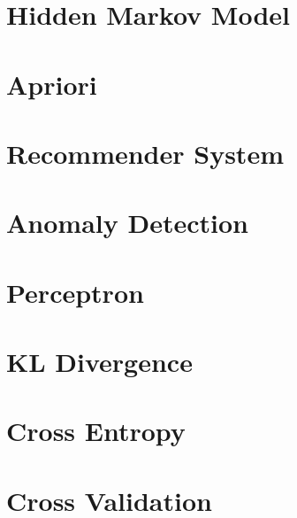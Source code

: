 \documentclass{article}
\begin{document}
\section{Hidden Markov Model}
\section{Apriori}
\section{Recommender System}
\section{Anomaly Detection} 
\section{Perceptron}
\section{KL Divergence}
\section{Cross Entropy}
\section{Cross Validation}
\end{document}
